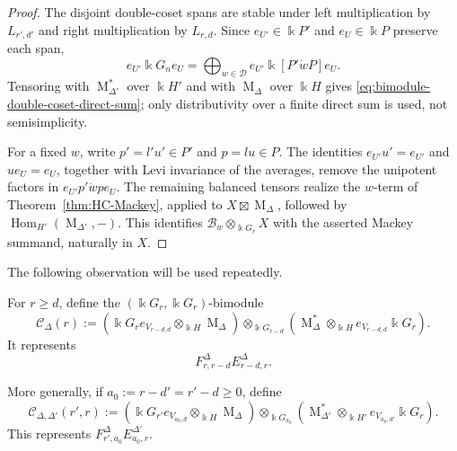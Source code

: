 \documentclass[12pt]{amsart}
\numberwithin{itemcounter}{subsection}
\theoremstyle{plain}
\theoremstyle{definition}
\theoremstyle{remark}
\numberwithin{equation}{section}
\def\k{\Bbbk}
\def\M{{\operatorname{M}\nolimits}}
\def\Hom{\operatorname{Hom}\nolimits}
\def\Hom{\operatorname{Hom}}
\begin{document}
\begin{proof}
The disjoint double-coset spans are stable under left multiplication by
\(L_{r',d'}\) and right multiplication by \(L_{r,d}\).  Since
\(e_{U'}\in\k P'\) and \(e_U\in\k P\) preserve each span,
\[
e_{U'}\k G_ne_U
=\bigoplus_{w\in\mathcal D}e_{U'}\k[P'\dot wP]e_U.
\]
Tensoring with \(\M_{\Delta'}^*\) over \(\k H'\) and with
\(\M_\Delta\) over \(\k H\) gives
\eqref{eq:bimodule-double-coset-direct-sum}; only distributivity over a
finite direct sum is used, not semisimplicity.

For a fixed \(w\), write \(p'=l'u'\in P'\) and \(p=lu\in P\).
The identities \(e_{U'}u'=e_{U'}\) and \(ue_U=e_U\), together with
Levi invariance of the averages, remove the unipotent factors in
\(e_{U'}p'\dot wp e_U\).  The remaining balanced tensors realize the
\(w\)-term of Theorem~\ref{thm:HC-Mackey}, applied to
\(X\boxtimes\M_\Delta\), followed by
\(\Hom_{H'}(\M_{\Delta'},-)\).  This identifies
\(\mathscr B_w\otimes_{\k G_r}X\) with the asserted Mackey summand,
naturally in \(X\).
\end{proof}

The following observation will be used repeatedly.

For \(r\ge d\), define the \((\k G_r,\k G_r)\)-bimodule
\begin{equation*}
\mathscr C_\Delta(r)
:=
\left(
\k G_r e_{V_{r-d,d}}
\otimes_{\k H}\M_\Delta
\right)
\otimes_{\k G_{r-d}}
\left(
\M_\Delta^*
\otimes_{\k H}
e_{V_{r-d,d}}\k G_r
\right).
\end{equation*}
It represents
\[
F^\Delta_{r,r-d}E^\Delta_{r-d,r}.
\]

More generally, if \(a_0:=r-d'=r'-d\ge0\), define
\begin{equation*}
\mathscr C_{\Delta,\Delta'}(r',r)
:=
\left(
\k G_{r'}e_{V_{a_0,d}}\otimes_{\k H}\M_\Delta
\right)
\otimes_{\k G_{a_0}}
\left(
\M_{\Delta'}^*\otimes_{\k H'}e_{V_{a_0,d'}}\k G_r
\right).
\end{equation*}
This represents \(F^\Delta_{r',a_0}E^{\Delta'}_{a_0,r}\).
\end{document}
